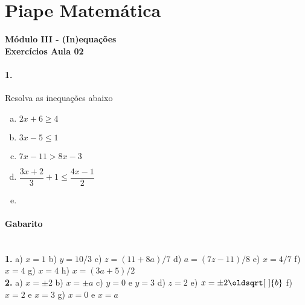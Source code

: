 \documentclass[a4paper,12pt]{article}
\renewcommand*{\sqrt}[2][\ ]{\oldsqrt[#1]{#2}}
\begin{document}
 
  
\section*{Piape Matemática} 
\textbf{Módulo III - (In)equações}\\
\textbf{Exercícios Aula 02}         
\begin{multicols}{2}
\paragraph*{1.} Resolva as inequações abaixo
\begin{enumerate}[a)]  
    \item $2x + 6 \ge 4$
    \item $3x - 5 \le 1$
    \item $7x - 11 > 8x - 3$
    \item $\dfrac{3x+2}{3} + 1 \le \dfrac{4x-1}{2}$
    \item 
\end{enumerate}

\vspace*{0cm}
\end{multicols}
 
\vspace*{\fill}
{\footnotesize
\paragraph*{Gabarito} \hspace*{\fill}\\
\textbf{1.}
 a) $x =1$ b) $y = 10/3$ c) $z= (11+8a)/7$ d) $a = (7z-11)/8$ e) $x = 4/7$ f) $x = 4$ g) $x = 4$ h) $x = (3a+5)/2$ \\
\textbf{2.}
a) $x = \pm 2$ b) $x = \pm a$ c) $y = 0$ e $y = 3$ d) $z = 2$ e) $x = \pm 2\sqrt{b}$ f) $x = 2$ e $x = 3$ g) $x = 0$ e $x = a$
}
\end{document}
